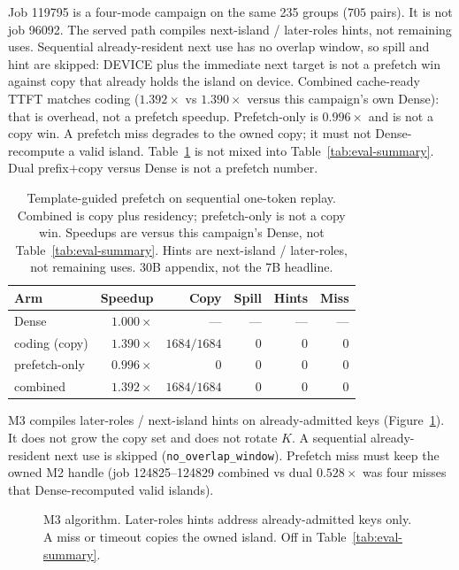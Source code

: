 Job 119795 is a four-mode campaign on the same 235 groups ($705$ pairs).
It is not job 96092. The served path compiles next-island /
later-roles hints, not remaining uses. Sequential already-resident next
use has no overlap window, so spill and hint are skipped: DEVICE plus
the immediate next target is not a prefetch win against copy that already
holds the island on device. Combined cache-ready TTFT matches coding
($1.392\times$ vs $1.390\times$ versus this campaign's own Dense): that
is overhead, not a prefetch speedup. Prefetch-only is $0.996\times$ and
is not a copy win. A prefetch miss degrades to the owned copy; it must
not Dense-recompute a valid island. Table~\ref{tab:template-prefetch} is
not mixed into Table~\ref{tab:eval-summary}. Dual prefix$+$copy versus
Dense is not a prefetch number.

\begin{table}[t]
\centering
\small
\caption{Template-guided prefetch on sequential one-token replay.
Combined is copy plus residency; prefetch-only is not a copy win.
Speedups are versus this campaign's Dense, not
Table~\ref{tab:eval-summary}. Hints are next-island / later-roles,
not remaining uses. 30B appendix, not the 7B headline.}
\label{tab:template-prefetch}
\begin{tabular}{lrrrrr}
\toprule
\textbf{Arm} & \textbf{Speedup} & \textbf{Copy} & \textbf{Spill} & \textbf{Hints} & \textbf{Miss} \\
\midrule
Dense & $1.000\times$ & --- & --- & --- & --- \\
coding (copy) & $1.390\times$ & $1684/1684$ & $0$ & $0$ & $0$ \\
prefetch-only & $0.996\times$ & $0$ & $0$ & $0$ & $0$ \\
combined & $1.392\times$ & $1684/1684$ & $0$ & $0$ & $0$ \\
\bottomrule
\end{tabular}
\end{table}

M3 compiles later-roles / next-island hints on already-admitted keys
(Figure~\ref{fig:prefetch-pipeline}). It does not grow the copy set and
does not rotate $K$. A sequential already-resident next use is skipped
(\texttt{no\_overlap\_window}). Prefetch miss must keep the owned M2
handle (job 124825--124829 combined vs dual $0.528\times$ was four
misses that Dense-recomputed valid islands).

\begin{figure}[ht]
\centering
\resizebox{0.92\columnwidth}{!}{}
\caption{M3 algorithm. Later-roles hints address already-admitted keys
only. A miss or timeout copies the owned island. Off in
Table~\ref{tab:eval-summary}.}
\label{fig:prefetch-pipeline}
\end{figure}

